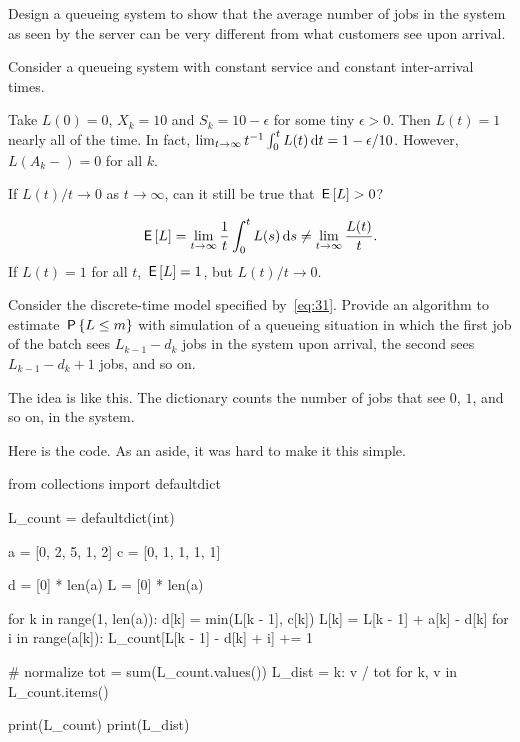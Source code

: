 \begin{exercise}\label{ex:l-165}
Design a queueing system to show that the average number of jobs in the system as seen by the server can be very different from what customers see upon arrival.
\begin{hint}
Consider a queueing system with constant service and constant inter-arrival times.
\end{hint}
\begin{solution}
 Take $L(0) = 0$, $X_k = 10$ and $S_k = 10-\epsilon$ for some tiny
 $\epsilon>0$. Then $L(t) = 1$ nearly all of the time. In fact,
 $\lim_{t\to\infty}t^{-1}\int_0^t L(t) \,\textrm{d}t= 1-\epsilon/10$. However, $L(A_k-)=0$ for all $k$.
\end{solution}
\end{exercise}


\begin{exercise}\label{ex:90}
 If $L(t)/t \to 0$ as $t\to\infty$, can it still be true that $\,\mathsf{E}\left[L\right]>0$?
\begin{solution}
 \begin{equation*}
 \,\mathsf{E}\left[L\right] = \lim_{t\to\infty} \frac 1 t \int_0^t L(s) \,\textrm{d}s \neq \lim_{t\to\infty} \frac{L(t)}t.
 \end{equation*}
If $L(t)=1$ for all $t$, $\,\mathsf{E}\left[L\right] =1 $, but $L(t)/t \to 0$.
\end{solution}
\end{exercise}


\begin{exercise}\label{ex:l-166}
Consider 
 the discrete-time model specified by~\cref{eq:31}.
Provide
an algorithm to estimate  $\,\mathsf{P}\left\{L\leq m\right\}$ with  simulation of a queueing situation in which  the first job of the batch sees $L_{k-1} - d_k$ jobs in the system upon arrival,
the second sees $L_{k-1}-d_k + 1$ jobs, and so on.

\begin{solution}
The idea is like this. The dictionary  counts the number of jobs that see $0$, $1$, and so on, in the system.

Here is the code. As an aside, it was hard to make it this simple.
\begin{pyconsole}
from collections import defaultdict

L_count = defaultdict(int)

a = [0, 2, 5, 1, 2]
c = [0, 1, 1, 1, 1]

d = [0] * len(a)
L = [0] * len(a)

for k in range(1, len(a)):
    d[k] = min(L[k - 1], c[k])
    L[k] = L[k - 1] + a[k] - d[k]
    for i in range(a[k]):
        L_count[L[k - 1] - d[k] + i] += 1


# normalize
tot = sum(L_count.values())
L_dist = {k: v / tot for k, v in L_count.items()}

print(L_count)
print(L_dist)
\end{pyconsole}

\end{solution}
\end{exercise}



